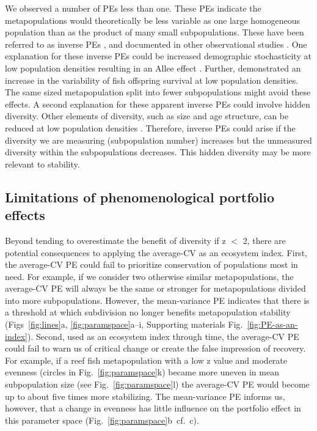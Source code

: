 We observed a number of PEs less than one. These PEs indicate the
metapopulations would theoretically be less variable as one large homogeneous
population than as the product of many small subpopulations. These have been
referred to as inverse PEs \citep{thibaut2013}, and documented in other
observational studies \citep{deClerck2006}.
One explanation for these inverse PEs could be increased
demographic stochasticity at low population densities resulting in an Allee
effect \citep{allee1931}. Further, \citet{minto2008} demonstrated an
increase in the variability of fish offspring survival at low population
densities. The same sized metapopulation split into fewer subpopulations might
avoid these effects. A second explanation for these apparent inverse PEs
could involve hidden diversity. Other elements of diversity, such as size and
age structure, can be reduced at low population densities
\citep[e.g.][]{hutchings1993}. Therefore, inverse PEs could arise if the
diversity we are measuring (subpopulation number) increases but the unmeasured
diversity within the subpopulations decreases. This hidden diversity may be
more relevant to stability.

\subsection{Limitations of phenomenological portfolio effects}

Beyond tending to overestimate the benefit of diversity if z $<$ 2, there are
potential consequences to applying the average-CV as an ecosystem index. First,
the average-CV PE could fail to prioritize conservation of populations most in
need. For example, if we consider two otherwise similar metapopulations, the
average-CV PE will always be the same or stronger for metapopulations divided
into more subpopulations. However, the mean-variance PE indicates that there is
a threshold at which subdivision no longer benefits metapopulation stability
(Figs~\ref{fig:lines}a, \ref{fig:paramspace}a--i, Supporting materials Fig.\ \ref{fig:PE-as-an-index}).
Second, used as an ecosystem index through time, the average-CV PE could fail to
warn us of critical change or create the false impression of recovery. For
example, if a reef fish metapopulation with a low z value and moderate evenness
(circles in Fig.~\ref{fig:paramspace}k) became more uneven in mean subpopulation
size (see Fig.~\ref{fig:paramspace}l) the average-CV PE would become up to about
five times more stabilizing. The mean-variance PE informs us, however, that a
change in evenness has little influence on the portfolio effect in this
parameter space (Fig.~\ref{fig:paramspace}b~cf.~c).

